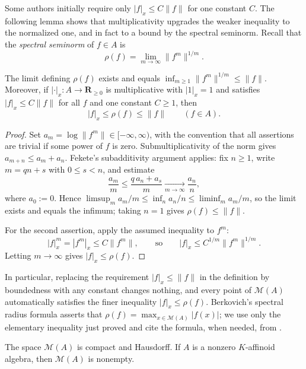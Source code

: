 Some authors initially require only $ |f|_x\leq C\|f\| $ for one constant
$C$. The following lemma shows that multiplicativity upgrades the weaker
inequality to the normalized one, and in fact to a bound by the spectral
seminorm.  Recall that the \emph{spectral seminorm}
of $f\in A$ is
\[
                     \rho(f)=\lim_{m\to\infty}\|f^m\|^{1/m}.
\]

\begin{lemma}\label{lem:berk-spectral-bound}
The limit defining $\rho(f)$ exists and equals
$\inf_{m\geq1}\|f^m\|^{1/m}\leq\|f\|$.  Moreover, if
$|\cdot|_x:A\to\mathbf R_{\geq0}$ is multiplicative with $|1|_x=1$ and
satisfies $|f|_x\leq C\|f\|$ for all $f$ and one constant $C\geq1$,
then
\[
                     |f|_x\leq\rho(f)\leq\|f\|
                     \qquad(f\in A).
\]
\end{lemma}

\begin{proof}
Set $a_m=\log\|f^m\|\in[-\infty,\infty)$, with the convention that all
assertions are trivial if some power of $f$ is zero.  Submultiplicativity
of the norm gives $a_{m+n}\leq a_m+a_n$.  Fekete's subadditivity argument
applies: fix $n\geq1$, write $m=qn+s$ with $0\leq s<n$, and estimate
\[
 \frac{a_m}{m}\leq\frac{q\,a_n+a_s}{m}
 \xrightarrow[m\to\infty]{}\frac{a_n}{n},
\]
where $a_0:=0$.  Hence $\limsup_m a_m/m\leq\inf_n a_n/n\leq\liminf_m
a_m/m$, so the limit exists and equals the infimum; taking $n=1$ gives
$\rho(f)\leq\|f\|$.

For the second assertion, apply the assumed inequality to $f^m$:
\[
 |f|_x^m=|f^m|_x\leq C\|f^m\|,
 \qquad\text{so}\qquad
 |f|_x\leq C^{1/m}\|f^m\|^{1/m}.
\]
Letting $m\to\infty$ gives $|f|_x\leq\rho(f)$.
\end{proof}

In particular, replacing the requirement $|f|_x\le\|f\|$ in the
definition by boundedness with any constant changes nothing, and every
point of $\mathcal M(A)$ automatically satisfies the finer inequality
$|f|_x\le\rho(f)$.  Berkovich's spectral radius formula asserts that
$\rho(f)=\max_{x\in\mathcal M(A)}|f(x)|$; we use only the elementary
inequality just proved and cite the formula, when needed, from
\cite[Theorem~1.3.1]{Berk12}.

\begin{proposition}\label{prop:berk-compact-spectrum}
The space $\mathcal M(A)$ is compact and Hausdorff. If $A$ is a nonzero
$K$-affinoid algebra, then $\mathcal M(A)$ is nonempty.
\end{proposition}

